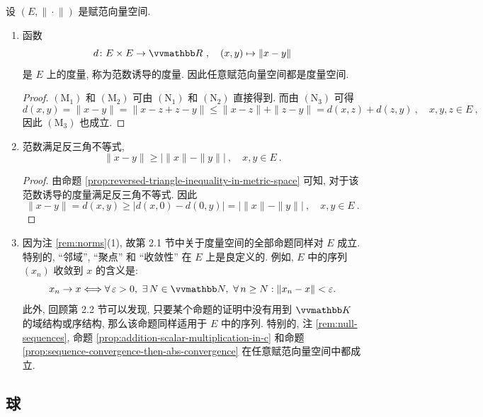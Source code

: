 \begin{remark}\label{rem:norms}
    设 \((E, \|\!\cdot\!\|)\) 是赋范向量空间.
    \begin{enumerate}
        \item 函数
        \[
            d \colon E \times E \to \R\ ,\quad (x, y) \mapsto \|x - y\|
        \]
        是 \(E\) 上的度量, 称为范数诱导的度量. 因此任意赋范向量空间都是度量空间.
        \begin{proof}
            \hyperref[ax:metric]{\((\mathrm M_1)\)} 和 \hyperref[ax:metric]{\((\mathrm M_2)\)} 可由 \hyperref[ax:norm]{\((\mathrm N_1)\)} 和 \hyperref[ax:norm]{\((\mathrm N_2)\)} 直接得到. 而由 \hyperref[ax:norm]{\((\mathrm N_3)\)} 可得
            \[
                d(x, y) = \|x - y\| = \|x - z + z - y\| \leq \|x - z\| + \|z - y\| = d(x, z) + d(z, y)\ ,\quad x, y, z \in E\ ,
            \]
            因此 \hyperref[ax:metric]{\((\mathrm M_3)\)} 也成立.
        \end{proof}
        \item 范数满足反三角不等式,
        \[
            \|x - y\| \geq \bigl|\|x\| - \|y\|\bigr|\ ,\quad x, y \in E\ .
        \]
        \begin{proof}
            由命题 \ref{prop:reversed-triangle-inequality-in-metric-space} 可知, 对于该范数诱导的度量满足反三角不等式. 因此
            \[
                \|x - y\| = d(x, y) \geq |d(x, 0) - d(0, y)| = \bigl|\|x\| - \|y\|\bigr|\ ,\quad x, y \in E\ .
            \]
        \end{proof}
        \item 因为注 \ref{rem:norms}(1), 故第 2.1 节中关于度量空间的全部命题同样对 \(E\) 成立. 特别的, ``邻域'', ``聚点'' 和 ``收敛性'' 在 \(E\) 上是良定义的. 例如, \(E\) 中的序列 \((x_n)\) 收敛到 \(x\) 的含义是:
        \[
            x_n \to x \iff \forall\, \varepsilon > 0,\ \exists\, N \in \N,\ \forall\, n \geq N : \|x_n - x\| < \varepsilon.
        \]
        此外, 回顾第 2.2 节可以发现, 只要某个命题的证明中没有用到 \(\K\) 的域结构或序结构, 那么该命题同样适用于 \(E\) 中的序列. 特别的, 注 \ref{rem:null-sequences}, 命题 \ref{prop:addition-scalar-multiplication-in-c} 和命题 \ref{prop:sequence-convergence-then-abs-convergence} 在任意赋范向量空间中都成立.
    \end{enumerate}
\end{remark}

\subsection{球}


